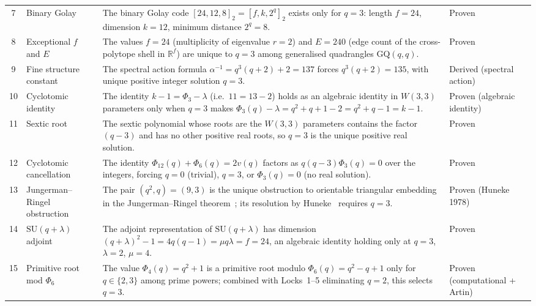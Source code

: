 \begin{center}
\begin{tabular}{clp{6.8cm}l}
7 & Binary Golay &
  The binary Golay code $[24, 12, 8]_2 = [f, k, 2^q]_2$ exists only for $q = 3$:
  length $f = 24$, dimension $k = 12$, minimum distance $2^q = 8$. &
  Proven \\[2pt]

8 & Exceptional $f$ and $E$ &
  The values $f = 24$ (multiplicity of eigenvalue $r = 2$) and $E = 240$ (edge count
  of the cross-polytope shell in $\mathbb{R}^f$) are unique to $q = 3$ among
  generalised quadrangles $\mathrm{GQ}(q,q)$. &
  Proven \\[2pt]

9 & Fine structure constant &
  The spectral action formula $\alpha^{-1} = q^3(q+2) + 2 = 137$ forces
  $q^3(q+2) = 135$, with unique positive integer solution $q = 3$. &
  Derived (spectral action) \\[2pt]

10 & Cyclotomic identity &
  The identity $k - 1 = \Phi_3 - \lambda$ (i.e.\ $11 = 13 - 2$) holds as an algebraic
  identity in $W(3,3)$ parameters only when $q = 3$ makes
  $\Phi_3(q) - \lambda = q^2 + q + 1 - 2 = q^2 + q - 1 = k - 1$. &
  Proven (algebraic identity) \\[2pt]

11 & Sextic root &
  The sextic polynomial whose roots are the $W(3,3)$ parameters contains the factor
  $(q-3)$ and has no other positive real roots, so $q = 3$ is the unique
  positive real solution. &
  Proven \\[2pt]

12 & Cyclotomic cancellation &
  The identity $\Phi_{12}(q) + \Phi_6(q) = 2v(q)$ factors as $q(q-3)\Phi_3(q) = 0$
  over the integers, forcing $q = 0$ (trivial), $q = 3$, or $\Phi_3(q) = 0$
  (no real solution). &
  Proven \\[2pt]

13 & Jungerman--Ringel obstruction &
  The pair $(q^2, q) = (9, 3)$ is the unique obstruction to orientable triangular
  embedding in the Jungerman--Ringel theorem~\cite{JR1980_part21}; its resolution by
  Huneke~\cite{Huneke1978} requires $q = 3$. &
  Proven (Huneke 1978) \\[2pt]

14 & $\mathrm{SU}(q+\lambda)$ adjoint &
  The adjoint representation of $\mathrm{SU}(q+\lambda)$ has dimension
  $(q+\lambda)^2 - 1 = 4q(q-1) = \mu q\lambda = f = 24$, an algebraic
  identity holding only at $q = 3$, $\lambda = 2$, $\mu = 4$. &
  Proven \\[2pt]

15 & Primitive root mod $\Phi_6$ &
  The value $\Phi_4(q) = q^2 + 1$ is a primitive root modulo $\Phi_6(q) = q^2 - q + 1$
  only for $q \in \{2, 3\}$ among prime powers; combined with Locks~1--5
  eliminating $q = 2$, this selects $q = 3$. &
  Proven (computational + Artin) \\[2pt]

\hline
\end{tabular}
\end{center}

